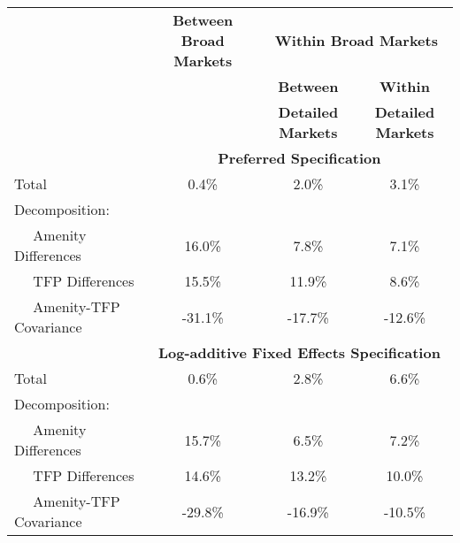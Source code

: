 \begin{tabular}{lccc}
\toprule 
\midrule 
  & \textbf{Between Broad Markets} & \multicolumn{2}{c}{\textbf{Within Broad Markets}} \\
 \cmidrule(lr){2-2} \cmidrule(lr){3-4} 
  &  & \textbf{Between} & \textbf{Within} \\
  &  & \textbf{Detailed Markets} & \textbf{Detailed Markets} \\
\midrule 
 & \multicolumn{3}{c}{\textbf{Preferred Specification}} \\
Total & 0.4\% & 2.0\% & 3.1\% \\
Decomposition: \\
$\quad$ Amenity Differences & 16.0\% & 7.8\% & 7.1\% \\
$\quad$ TFP Differences & 15.5\% & 11.9\% & 8.6\% \\
$\quad$ Amenity-TFP Covariance & -31.1\% & -17.7\% & -12.6\% \\
\midrule 
 & \multicolumn{3}{c}{\textbf{Log-additive Fixed Effects Specification}} \\
Total & 0.6\% & 2.8\% & 6.6\% \\
Decomposition: \\
$\quad$ Amenity Differences & 15.7\% & 6.5\% & 7.2\% \\
$\quad$ TFP Differences & 14.6\% & 13.2\% & 10.0\% \\
$\quad$ Amenity-TFP Covariance & -29.8\% & -16.9\% & -10.5\% \\
\midrule 
\bottomrule 
\end{tabular}
